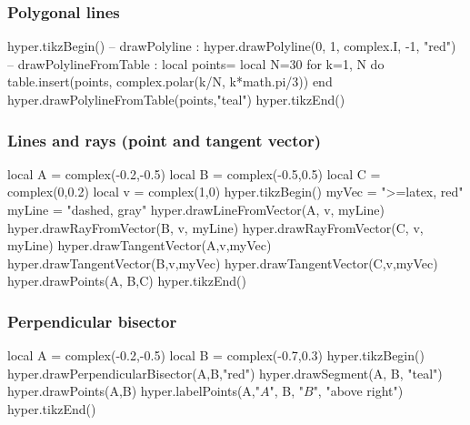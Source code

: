 \documentclass{article}
\begin{document}
\subsubsection{Polygonal lines}
\begin{codeandresult}
\begin{luacode*}
hyper.tikzBegin()
-- drawPolyline : 
hyper.drawPolyline(0, 1, complex.I, -1, "red")
-- drawPolylineFromTable : 
local points={}
local N=30
for k=1, N do
	table.insert(points, complex.polar(k/N, k*math.pi/3))
end
hyper.drawPolylineFromTable(points,"teal")
hyper.tikzEnd()
\end{luacode*}
\end{codeandresult}




\subsubsection{Lines and rays (point and tangent vector)}
\begin{codeandresult}
\begin{luacode*}
local A = complex(-0.2,-0.5)
local B = complex(-0.5,0.5)
local C = complex(0,0.2)
local v =  complex(1,0)
hyper.tikzBegin()
myVec = ">=latex, red"
myLine = "dashed, gray"
hyper.drawLineFromVector(A, v, myLine)
hyper.drawRayFromVector(B, v, myLine)
hyper.drawRayFromVector(C, v, myLine)
hyper.drawTangentVector(A,v,myVec)
hyper.drawTangentVector(B,v,myVec)
hyper.drawTangentVector(C,v,myVec)
hyper.drawPoints(A, B,C)
hyper.tikzEnd()
\end{luacode*}
\end{codeandresult}






\subsubsection{Perpendicular bisector}
\begin{codeandresult}
\begin{luacode*}
local A = complex(-0.2,-0.5)
local B = complex(-0.7,0.3)
hyper.tikzBegin()
hyper.drawPerpendicularBisector(A,B,"red")
hyper.drawSegment(A, B, "teal")
hyper.drawPoints(A,B)
hyper.labelPoints(A,"$A$", B, "$B$", "above right")
hyper.tikzEnd()
\end{luacode*}
\end{codeandresult}
\end{document}
